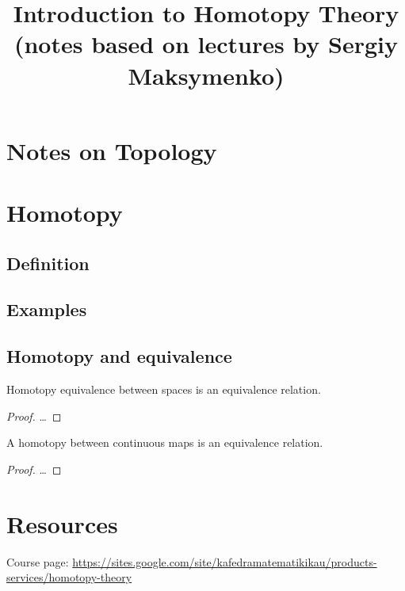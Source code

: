 \documentclass[10pt]{article}
\title{Introduction to Homotopy Theory \\
  \large (notes based on lectures by Sergiy Maksymenko)
}
\author{}
\date{}
\begin{document}
\maketitle
\thispagestyle{fancy}


\begin{abstract}
\end{abstract}

\tableofcontents

\section{Notes on Topology}

\section{Homotopy}

\subsection{Definition}
\subsection{Examples}
\subsection{Homotopy and equivalence}

\begin{theorem}
  Homotopy equivalence between spaces is an equivalence relation.
\end{theorem}

\begin{proof}
  \ldots
\end{proof}

\begin{theorem}
  A homotopy between continuous maps is an equivalence relation.
\end{theorem}

\begin{proof}
  \ldots
\end{proof}

\section{Resources}

Course page: \url{https://sites.google.com/site/kafedramatematikikau/products-services/homotopy-theory}

{}

\end{document}
